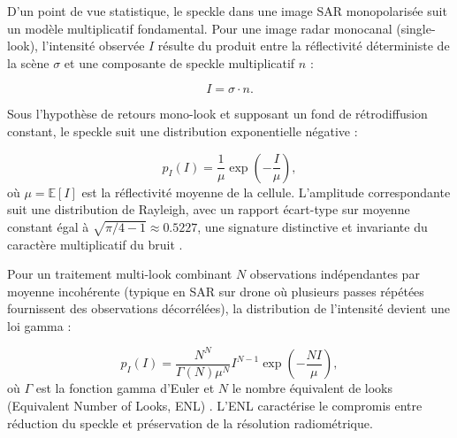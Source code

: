 
D'un point de vue statistique, le speckle dans une image SAR monopolarisée suit un modèle multiplicatif fondamental. Pour une image radar monocanal (single-look), l'intensité observée $I$ résulte du produit entre la réflectivité déterministe de la scène $\sigma$ et une composante de speckle multiplicatif $n$ \cite{lee1986speckle} :

\begin{equation}
I = \sigma \cdot n.
\label{eq:modele_mutliplicatif}
\end{equation}

Sous l'hypothèse de retours mono-look et supposant un fond de rétrodiffusion constant, le speckle suit une distribution exponentielle négative \cite{lee1986speckle} :

\begin{equation}
p_I(I) = \frac{1}{\mu} \exp\left(-\frac{I}{\mu}\right),
\label{eq:expo_speckle}
\end{equation}
où $\mu = \mathbb{E}[I]$ est la réflectivité moyenne de la cellule. L'amplitude correspondante suit une distribution de Rayleigh, avec un rapport écart-type sur moyenne constant égal à $\sqrt{\pi/4 - 1} \approx 0.5227$, une signature distinctive et invariante du caractère multiplicatif du bruit \cite{lee1986speckle,oliver1993enl}.

Pour un traitement multi-look combinant $N$ observations indépendantes par moyenne incohérente (typique en SAR sur drone où plusieurs passes répétées fournissent des observations décorrélées), la distribution de l'intensité devient une loi gamma \cite{lee1986speckle,oliver1993enl} :

\begin{equation}
p_I(I) = \frac{N^N}{\Gamma(N)\mu^N} I^{N-1} \exp\left(-\frac{N I}{\mu}\right),
\label{eq:gamma_speckle}
\end{equation}
où $\Gamma$ est la fonction gamma d'Euler et $N$ le nombre équivalent de looks (Equivalent Number of Looks, ENL) \cite{anfinsen2009enl,oliver1993enl}. L'ENL caractérise le compromis entre réduction du speckle et préservation de la résolution radiométrique.


